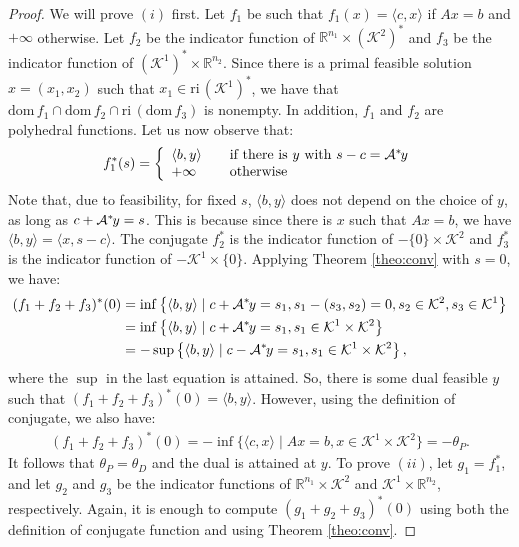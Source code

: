 \documentclass{article}
\newcommand{\reInt}{\mathrm{ri}\,}
\newcommand{\inProd}[2]{\langle #1 , #2 \rangle }
\newcommand{\stdMap}{ {\mathcal{A}}}
\newcommand{\stdCone}{ {\mathcal{K}}}
\newcommand{\pOpt}{ {\theta _P}}
\newcommand{\dOpt}{ {\theta _D}}
\renewcommand{\Re}{\mathbb{R}}
\newcommand{\fDom}{\mathrm{ dom } \,}
\newcommand{\T}{\ast\hspace{-1pt}}
\begin{document}
\begin{proof}
We will prove $(i)$ first. Let 
$f_1$ be such that $f_1(x) = \inProd{c}{x}$ if $Ax = b$ and $+\infty$ otherwise.
Let  $f_2$ be the indicator function of $\Re^{n_1}\times (\stdCone ^2)^*$ and $f_3$ be the indicator 
function of $(\stdCone ^1)^*\times \Re^{n_2}$. Since there is  a primal feasible solution $x = (x_1,x_2)$ such 
that $x_1 \in \reInt (\stdCone ^1)^*$, we have that $\fDom f_1 \cap \fDom f_2 \cap \reInt (\fDom f_3)$ is 
nonempty. In addition, $f_1$ and $f_2$ are polyhedral functions. Let us now observe that:
\begin{align*}
f_1^*(s) = \left\{
  \begin{array}{l l}
    \inProd{b}{y}  & \quad \text{if there is $y$ with $s-c = \stdMap^\T y$}\\
    +\infty & \quad \text{otherwise}
  \end{array}\right. 
\end{align*}
Note that, due to feasibility, for fixed $s$, $\inProd{b}{y}$ does not depend on the choice 
of $y$, as long as $c+\stdMap ^\T y = s$. This is because since there is $x$ such that $Ax = b$, we have $\inProd{b}{y} = \inProd{x}{s-c}$.
The conjugate $f_2^*$ is the indicator function of $- \{0\}\times \stdCone ^2$ and 
$f_3^*$ is the indicator function of $- \stdCone ^1\times \{0\}$. 
Applying Theorem \ref{theo:conv} with $s = 0$, we have:
\begin{align*}
(f_1+f_2+f_3)^*(0) & = \inf \left\{ \inProd{b}{y} \mid  c+ \stdMap ^\T y = s_1, s_1 - (s_3,s_2) = 0,  s_2 \in  \stdCone ^2, s_3 \in \stdCone ^1      \right\} \\
 & = \inf \left\{ \inProd{b}{y} \mid  c+ \stdMap ^\T y = s_1, s_1 \in  \stdCone ^1\times \stdCone ^2      \right\} \\
& = - \sup \left\{ \inProd{b}{y} \mid  c -\stdMap ^\T y = s_1,  s_1 \in  \stdCone ^1 \times \stdCone ^2      \right\},
\end{align*}
where the $\sup$ in the last equation is attained. So, there is some dual feasible $y$ such that 
$(f_1+f_2+f_3)^*(0) =  \inProd{b}{y}$. However, using the definition of conjugate, we also have:
\begin{align*}
(f_1+f_2+f_3)^*(0) = - \inf \{ \inProd{c}{x} \mid Ax = b, x \in \stdCone ^1\times \stdCone ^2\} = -\theta _P.
\end{align*}
It follows that $\pOpt = \dOpt$ and the dual is attained at $y$. 
To prove $(ii)$, let $g_1 = f_1^*$, and let $g_2$ and $g_3$ be the indicator 
functions  of $\Re^{n_1}\times \stdCone ^2$ and  $\stdCone ^1 \times \Re^{n_2}$, respectively. Again, 
it is enough to compute $(g_1+g_2+g_3)^*(0)$ using both the definition of conjugate function and 
using Theorem \ref{theo:conv}. 
\end{proof}
\end{document}

